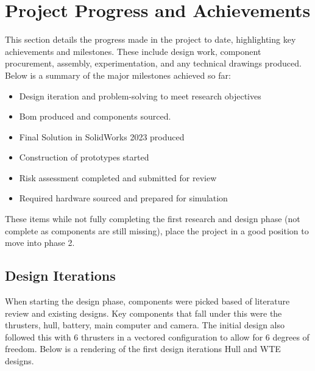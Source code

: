 \documentclass[11pt, a4paper]{article}
\begin{document}
\section{Project Progress and Achievements}
\label{sec:progress}
This section details the progress made in the project to date, highlighting key achievements and milestones. These include design work, component procurement, assembly, experimentation, and any technical drawings produced.
Below is a summary of the major milestones achieved so far:
\begin{itemize}
    \item Design iteration and problem-solving to meet research objectives
    \item Bom produced and components sourced.
    \item Final Solution in SolidWorks 2023 produced
    \item Construction of prototypes started
    \item Risk assessment completed and submitted for review
    \item Required hardware sourced and prepared for simulation
\end{itemize}
These items while not fully completing the first research and design phase (not complete as components are still missing), place the project in a good position to move into phase 2.
\newpage
\subsection{Design Iterations}
When starting the design phase, components were picked based of literature review and existing designs.
 Key components that fall under this were the thrusters, hull, battery, main computer and camera. The initial design also
 followed this with 6 thrusters in a vectored configuration to allow for 6 degrees of freedom. Below is a
 rendering of the first design iterations Hull and WTE designs.
\end{document}
